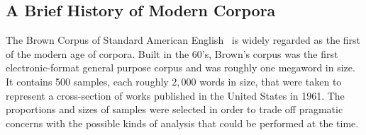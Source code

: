 % 
% 
% 
% 
% 
% 
% 
% 
% 



\subsection{A Brief History of Modern Corpora}
The Brown Corpus of Standard American English~\cite{francis1961brown}%
is widely regarded as the first of the modern age of corpora.  Built in the 60's, Brown's corpus was the first electronic-format general purpose corpus and was roughly one megaword in size.  %
It contains 500 samples, each roughly $2,000$ words in size, that were taken to represent a cross-section of works published in the United States in 1961.  The proportions and sizes of samples were selected in order to trade off pragmatic concerns with the possible kinds of analysis that could be performed at the time.

